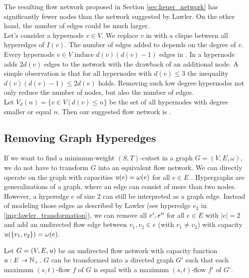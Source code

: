 The resulting flow network  proposed in Section \ref{sec:heuer_network} has significantly
fewer nodes than the network  suggested by Lawler. On the other hand, the number of
edges could be much larger. \\
Let's consider a hypernode $v \in V$. We replace $v$ in  with a clique between all
hyperedges of $I(v)$. The number of edges added to  depends on the degree of
$v$. Every hypernode $v \in V$ induce $d(v)(d(v) - 1)$ edges in . In  a hypernode adds $2d(v)$ edges to the network with the drawback
of an additional node. A simple observation is that for all hypernodes with $d(v) \le 3$ the inequality
$d(v)(d(v) - 1) \le 2d(v)$ holds. Removing such low degree hypernodes not only reduce
the number of nodes, but also the number of edges. \\
Let $V_{d}(n) = \{v \in V\ |\ d(v) \le n\}$ be the set of all hypernodes
with degree smaller or equal $n$. Then our suggested flow network is .

\subsection{Removing Graph Hyperedges}
\label{sec:edge_size_network}

If we want to find a minimum-weight $(S,T)$-cutset in a graph $G = (V,E,\omega)$, we do not have to transform
$G$ into an equivalent flow network. We can directly operate on the graph with capacities
$u(e) = \omega(e)$ for all $e \in E$ \cite{ford1956maximal}. Hypergraphs are generalizations of a graph, where
an edge can consist of more than two nodes. However, a hyperedge $e$ of size $2$ can still be 
interpreted as a graph edge. Instead of modeling those edges as described by Lawler \cite{lawler1973}
(see hyperedge $e_2$ in \autoref{img:lawler_transformation}), we can remove all $e',e''$ for all $e \in E$
with $|e| = 2$ and add an undirected flow edge between $v_1,v_2 \in e$ (with $v_1 \neq v_2$) with
capacity $u(\{v_1,v_2\}) = \omega(e)$.

\begin{lemma}
\label{lemma:undirected_transformation}
Let $G = (V,E,u)$ be an undirected flow network with capacity function $u: E \rightarrow \mathbb{N}_+$.
$G$ can be transformed into a directed graph $G'$ such that each maximum $(s,t)$-flow $f$ of $G$
is equal with a maximum $(s,t)$-flow $f'$ of $G'$.
\end{lemma}

